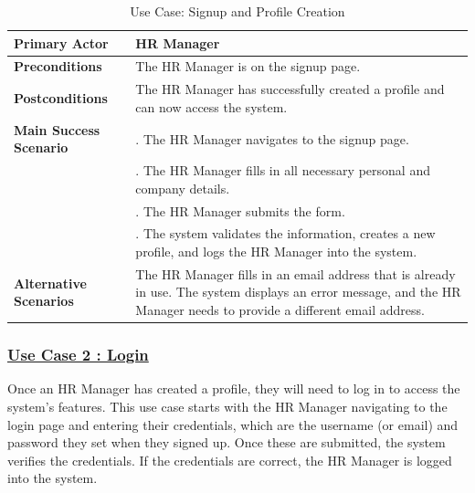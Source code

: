 \newpage
\begin{table}[H]
    \renewcommand{\arraystretch}{1.5}%
    \caption{Use Case: Signup and Profile Creation}
    \centering
    \medskip
    \begin{tabularx}{\textwidth} {
            | >{\hsize=0.5\hsize\raggedright\arraybackslash}X
            | >{\hsize=1.5\hsize\raggedright\arraybackslash}X |}
        \hline
        \textbf{Primary Actor} & HR Manager \\
        \hline
        \textbf{Preconditions} & The HR Manager is on the signup page. \\
        \hline
        \textbf{Postconditions} & The HR Manager has successfully created a profile and can now access the system. \\
        \hline
        \textbf{Main Success Scenario} & 1. The HR Manager navigates to the signup page. \\
        & 2. The HR Manager fills in all necessary personal and company details. \\
        & 3. The HR Manager submits the form. \\
        & 4. The system validates the information, creates a new profile, and logs the HR Manager into the system. \\
        \hline
        \textbf{Alternative Scenarios} & The HR Manager fills in an email address that is already in use. The system displays an error message, and the HR Manager needs to provide a different email address. \\
        \hline
    \end{tabularx}
\end{table}


\subsubsection{\underline{Use Case 2 : Login }}
Once an HR Manager has created a profile, they will need to log in to access the system's features. This use case starts with the HR Manager navigating to the login page and entering their credentials, which are the username (or email) and password they set when they signed up. Once these are submitted, the system verifies the credentials. If the credentials are correct, the HR Manager is logged into the system.

